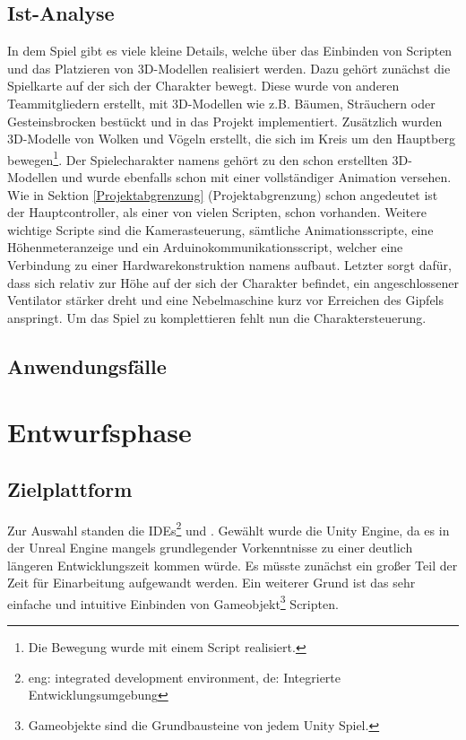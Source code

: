 \section{Ist-Analyse}
In dem Spiel gibt es viele kleine Details, welche über das Einbinden von Scripten und das Platzieren von 3D-Modellen realisiert werden. Dazu gehört zunächst die Spielkarte auf der sich der Charakter bewegt. Diese wurde von anderen Teammitgliedern erstellt, mit 3D-Modellen wie z.B. Bäumen, Sträuchern oder Gesteinsbrocken bestückt und in das Projekt implementiert. Zusätzlich wurden 3D-Modelle von Wolken und Vögeln erstellt, die sich im Kreis um den Hauptberg bewegen\footnote{Die Bewegung wurde mit einem Script realisiert.}.
Der Spielecharakter namens  gehört zu den schon erstellten 3D-Modellen und wurde ebenfalls schon mit einer vollständiger Animation versehen.
Wie in Sektion \ref{Projektabgrenzung} (Projektabgrenzung) schon angedeutet ist der Hauptcontroller, als einer von vielen Scripten, schon vorhanden. Weitere wichtige Scripte sind die Kamerasteuerung, sämtliche Animationsscripte, eine Höhenmeteranzeige und ein Arduinokommunikationsscript, welcher eine Verbindung zu einer Hardwarekonstruktion namens  aufbaut. Letzter sorgt dafür, dass sich relativ zur Höhe auf der sich der Charakter befindet, ein angeschlossener Ventilator stärker dreht und eine Nebelmaschine kurz vor Erreichen des Gipfels anspringt.
Um das Spiel zu komplettieren fehlt nun die Charaktersteuerung. 
\section{Anwendungsfälle}


\chapter{Entwurfsphase}
\section{Zielplattform}
Zur Auswahl standen die IDEs\footnote{eng: integrated development environment, de: Integrierte Entwicklungsumgebung}  und . Gewählt wurde die Unity Engine, da es in der Unreal Engine mangels grundlegender Vorkenntnisse zu einer deutlich längeren Entwicklungszeit kommen würde. Es müsste zunächst ein großer Teil der Zeit für Einarbeitung aufgewandt werden. 
Ein weiterer Grund ist das sehr einfache und intuitive Einbinden von Gameobjekt\footnote{Gameobjekte sind die Grundbausteine von jedem Unity Spiel.} Scripten.

